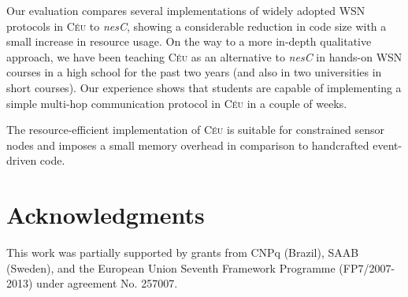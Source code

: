 \documentclass[letterpaper]{sig-alternate}
\newcommand{\CEU}{\textsc{C\'{e}u}\xspace}
\begin{document}
Our evaluation compares several implementations of widely adopted WSN protocols 
in \CEU to \emph{nesC}, showing a considerable reduction in code size with a 
small increase in resource usage.
%
On the way to a more in-depth qualitative approach, we have been teaching \CEU 
as an alternative to \emph{nesC} in hands-on WSN courses in a high school for 
the past two years (and also in two universities in short courses).
Our experience shows that students are capable of implementing a simple 
multi-hop communication protocol in \CEU in a couple of weeks.

The resource-efficient implementation of \CEU is suitable for constrained 
sensor nodes and imposes a small memory overhead in comparison to handcrafted 
event-driven code.


\section{Acknowledgments}

This work was partially supported by grants from CNPq (Brazil), SAAB (Sweden), 
and the European Union Seventh Framework Programme (FP7/2007-2013) under 
agreement No. 257007.

\balance


\end{document}
